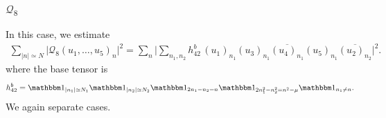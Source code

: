 \documentclass[11pt, xcolor = dvipsnames,reqno
]{amsart}
\theoremstyle{definition}
\theoremstyle{remark}
\begin{document}
    \subsubsection{$\mathcal Q_8$}
    In this case, we estimate
    \begin{align}\label{eq:4pairings-n1n3n4n5}
        \sum_{|n| \simeq N}  \big| \mathcal{Q}_8(u_1, \ldots, u_5)_n \big|^2
        = \sum_n \bigg| \sum_{ n_1, n_2} h^b_{42} \, (u_1)_{n_1} (u_3)_{n_1} \overline{(u_4)_{n_1}} (u_5)_{n_1} \overline{(u_2)_{n_2}} \bigg|^2.
    \end{align}
    where the base tensor is
    \begin{align*}
        h^b_{42} 
        = \mathbbm 1_{|n_1| \simeq N_1} 
        \mathbbm 1_{|n_2| \simeq N_2}
        \mathbbm 1_{2n_1 - n_2 = n}
        \mathbbm 1_{2n_1^2 - n_2^2 = n^2 - \mu}
        \mathbbm 1_{n_1 \neq n}.
    \end{align*}
    We again separate cases.
\end{document}
